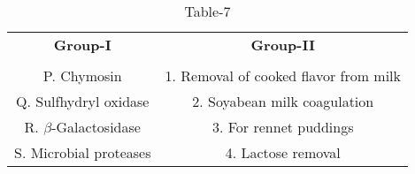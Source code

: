 \begin{table}[htbp]
  \centering
  \caption{Table-7}
  \label{table7}
  \begin{tabular}{cc}
  \textbf{Group-I} & \textbf{Group-II} \\ \\
    P. Chymosin & 1. Removal of cooked flavor from milk \\
    Q. Sulfhydryl oxidase & 2. Soyabean milk coagulation \\
    R. $\beta$-Galactosidase & 3. For rennet puddings \\
    S. Microbial proteases & 4. Lactose removal \\
  \end{tabular}
\end{table}